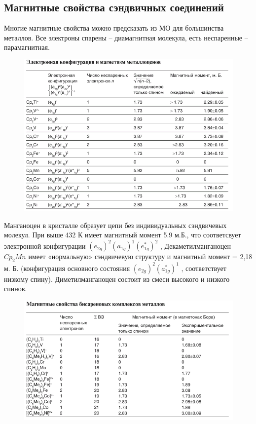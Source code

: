 \subsection{Магнитные свойства сэндвичных соединений}

Многие магнитные свойства можно предсказать из МО для большинства металлов. Все электроны спарены – диамагнитная молекула, есть неспаренные – парамагнитная.

\begin{figure}[H]
\centering
\includegraphics[scale=.600]{images/metallocenes_magn.png}
\end{figure}


Манганоцен в кристалле образует цепи без индивидуальных сэндвичевых молекул. При выше 432 К имеет магнитный момент 5.9 м.Б., что соответсвует электронной конфигурации $(e_{2g})^2 (a_{1g})^1 (e_{1g}^*)^2$ , Декаметилманганоцен $Cp_2Mn$ имеет «нормальную» сэндвичевую структуру и магнитный момент  = 2,18 м. Б. (конфигурация основного состояния $(e_{2g})^2 (a_{1g}^*)^1$ , соответствует низкому спину). Диметилманганоцен состоит из смеси высокого и низкого спинов.

\begin{figure}[H]
\centering
\includegraphics[scale=.600]{images/arenocenes_magn.png}
\end{figure}
